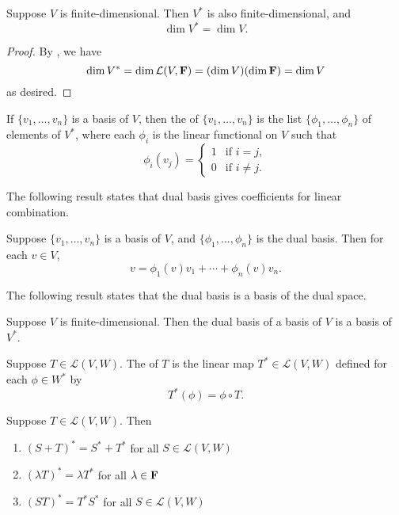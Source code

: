 \begin{lemma}
Suppose $V$ is finite-dimensional. Then $V^*$ is also finite-dimensional, and
\[\dim V^*=\dim V.\]
\end{lemma}

\begin{proof}
By , we have
\[\dim V^*=\dim\mathcal{L}(V,\mathbf F)=(\dim V)(\dim\mathbf F)=\dim V\]
as desired.
\end{proof}

\begin{definition}
If $\{v_1,\dots,v_n\}$ is a basis of $V$, then the  of $\{v_1,\dots,v_n\}$ is the list $\{\phi_1,\dots,\phi_n\}$ of elements of $V^*$, where each $\phi_i$ is the linear functional on $V$ such that
\[\phi_i(v_j)=\begin{cases}
1&\text{if }i=j,\\
0&\text{if }i\neq j.
\end{cases}\]
\end{definition}

The following result states that dual basis gives coefficients for linear combination.

\begin{proposition}
Suppose $\{v_1,\dots,v_n\}$ is a basis of $V$, and $\{\phi_1,\dots,\phi_n\}$ is the dual basis. Then for each $v\in V$,
\[v=\phi_1(v)v_1+\cdots+\phi_n(v)v_n.\]
\end{proposition}

The following result states that the dual basis is a basis of the dual space.

\begin{proposition}
Suppose $V$ is finite-dimensional. Then the dual basis of a basis of $V$ is a basis of $V^*$.
\end{proposition}

\begin{definition}
Suppose $T\in\mathcal{L}(V,W)$. The  of $T$ is the linear map $T^*\in\mathcal{L}(V,W)$ defined for each $\phi\in W^*$ by
\[T^*(\phi)=\phi\circ T.\]
\end{definition}

\begin{proposition}
Suppose $T\in\mathcal{L}(V,W)$. Then
\begin{enumerate}[label=(\arabic*)]
\item $(S+T)^*=S^*+T^*$ for all $S\in\mathcal{L}(V,W)$
\item $(\lambda T)^*=\lambda T^*$ for all $\lambda\in\mathbf F$
\item $(ST)^*=T^* S^*$ for all $S\in\mathcal{L}(V,W)$
\end{enumerate}
\end{proposition}

